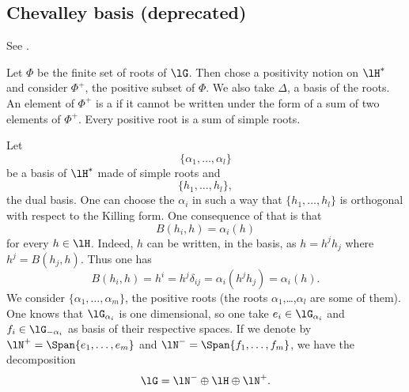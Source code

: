 \subsection{Chevalley basis (deprecated)}
See \cite{SSLA_Modave2005}.

Let $\Phi$ be the finite set of roots of $\lG$. Then chose a positivity notion on $\lH^*$ and consider $\Phi^+$, the positive subset of $\Phi$. We also take $\Delta$, a basis of the roots. An element of $\Phi^+$ is a  if it cannot be written under the form of a sum of two elements of $\Phi^+$. Every positive root is a sum of simple roots.

Let
\begin{equation}
	\{ \alpha_1,\ldots,\alpha_l \}
\end{equation}
be a basis of $\lH^*$ made of simple roots and
\begin{equation}
	\{ h_1,\ldots,h_l \},
\end{equation}
the dual basis. One can choose the $\alpha_i$ in such a way that $\{ h_1,\ldots,h_l \}$ is orthogonal with respect to the Killing form. One consequence of that is that
\begin{equation}            \label{EqBhihalphaih}
	B(h_i,h)=\alpha_i(h)
\end{equation}
for every $h\in\lH$. Indeed, $h$ can be written, in the basis, as $h=h^jh_j$ where $h^j=B(h_j,h)$. Thus one has
\begin{equation}
	B(h_i,h)=h^i=h^j\delta_{ij}=\alpha_i(h^jh_j)=\alpha_i(h).
\end{equation}
We consider $\{ \alpha_1,\ldots,\alpha_m \}$, the positive roots (the roots $\alpha_1$,\ldots,$\alpha_l$ are some of them). One knows that $\lG_{\alpha_i}$ is one dimensional, so one take $e_i\in\lG_{\alpha_i}$ and $f_i\in\lG_{-\alpha_i}$ as basis of their respective spaces. If we denote by $\lN^+=\Span\{ e_1,\ldots, e_m \}$ and $\lN^-=\Span\{ f_1,\ldots,f_m \}$, we have the decomposition
\begin{equation}
	\lG=\lN^-\oplus\lH\oplus\lN^+.
\end{equation}



